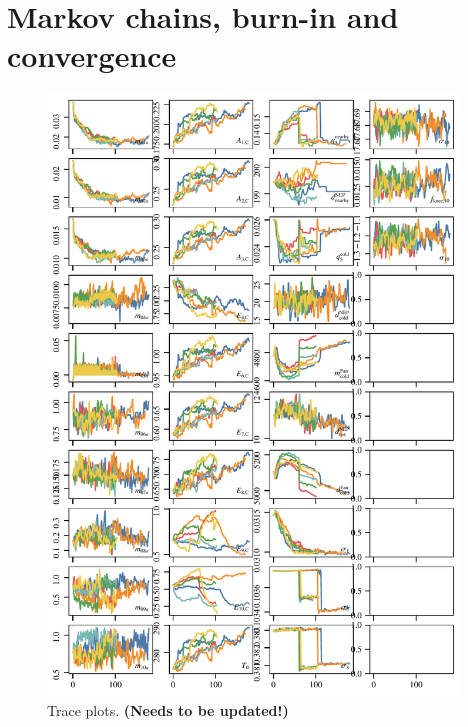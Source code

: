 \documentclass{aa}
\begin{document}




\clearpage
\section{Markov chains, burn-in and convergence}
\label{sec:chains}

\begin{figure}
    \centering
    \includegraphics[width=0.975\textwidth]{figs/traceplots.pdf}
    \caption{Trace plots. {\bf (Needs to be updated!)}}
    \label{fig:trace}
\end{figure}
\end{document}
